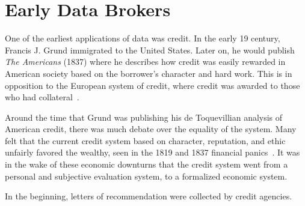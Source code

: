 \section{Early Data Brokers}

One of the earliest applications of data was credit. In the early 19
century, Francis J. Grund immigrated to the United States. Later on, he would
publish \textit{The Americans} (1837) where he describes how credit was easily
rewarded in American society based on the borrower's character and hard work.
This is in opposition to the European system of credit, where credit was
awarded to those who had collateral~\cite{lauer2017creditworthy}.

Around the time that Grund was publishing his de Toquevillian analysis of
American credit, there was much debate over the equality of the system.
Many felt that the current credit system based on character, reputation, and
ethic unfairly favored the wealthy, seen in the 1819 and 1837 financial
panics~\cite{lauer2017creditworthy}.  It was in the wake of these economic
downturns that the credit system went from a personal and subjective evaluation
system, to a formalized economic system.

In the beginning, letters of recommendation were collected by credit agencies.
